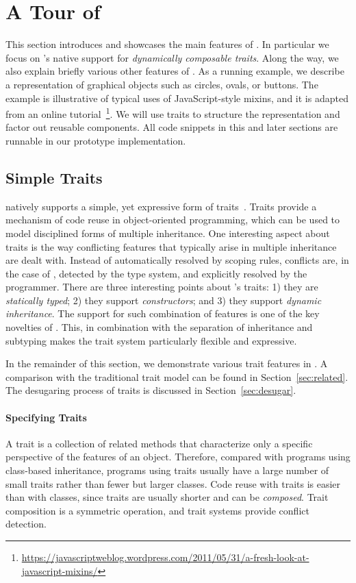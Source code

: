 \section{A Tour of \name}
\label{sec:traits}

This section introduces and showcases the main features of \name. In particular
we focus on \name's native support for \textit{dynamically composable traits}.
Along the way, we also explain briefly various other features of \name.
As a running example, we describe a representation of graphical objects such as
circles, ovals, or buttons. The example is illustrative of typical uses of
JavaScript-style mixins, and it is adapted from an online
tutorial~\footnote{\url{https://javascriptweblog.wordpress.com/2011/05/31/a-fresh-look-at-javascript-mixins/}}.
We will use traits to structure the representation and factor out reusable
components. All code snippets in this and later sections are runnable in our
prototype implementation.


\subsection{Simple Traits}

\name natively supports a simple, yet expressive form of
traits~\cite{scharli2003traits}. Traits provide a mechanism of code reuse in
object-oriented programming, which can be used to model disciplined forms of
multiple inheritance. One interesting aspect about traits is the way conflicting
features that typically arise in multiple inheritance are dealt with. Instead of
automatically resolved by scoping rules, conflicts are, in the case of \name,
detected by the type system, and explicitly resolved by the programmer.
There are three interesting points about \name's traits: 1) they are
\emph{statically typed}; 2) they support \emph{constructors}; and 3)
they support \emph{dynamic inheritance}. The support for such
combination of features is one of the key novelties of \name. This, in
combination with the separation of inheritance and subtyping makes the
trait system particularly flexible and expressive.

In the remainder of this section, we demonstrate various trait features in
\name. A comparison with the traditional trait model can be found in
Section~\ref{sec:related}. The desugaring process of traits is
discussed in Section~\ref{sec:desugar}.

\paragraph{Specifying Traits}
A trait is a collection of related methods that characterize only
a specific perspective of the features of an object. Therefore, compared with
programs using class-based inheritance, programs using traits usually have a large number of
small traits rather than fewer but larger classes. Code reuse with traits is
easier than with classes, since traits are usually shorter and can be
\textit{composed}. %
Trait composition is
a symmetric operation, and trait systems provide conflict detection.

